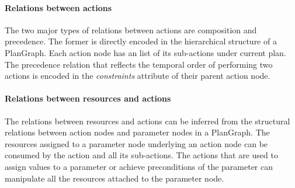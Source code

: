 \paragraph*{Relations between actions} %
\label{par:relations_between_actions}
The two major types of relations between actions are composition and precedence. The former is directly encoded in the hierarchical structure of a PlanGraph. Each action node has an list of its sub-actions under current plan. The precedence relation that reflects the temporal order of performing two actions is encoded in the \emph{constraints} attribute of their parent action node.

\paragraph*{Relations between resources and actions} %
\label{par:relations_between_resources_and_actions}
The relations between resources and actions can be inferred from the structural relations between action nodes and parameter nodes in a PlanGraph. The resources assigned to a parameter node underlying an action node can be consumed by the action and all its sub-actions. The actions that are used to assign values to a parameter or achieve preconditions of the parameter can manipulate all the resources attached to the parameter node.

